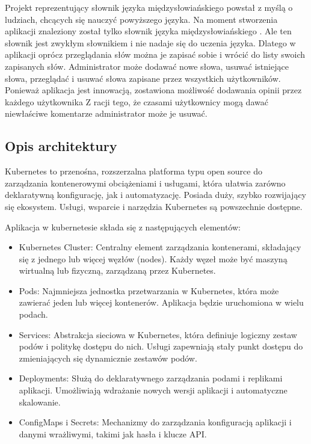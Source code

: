 \documentclass[12pt,a4paper]{article}
\begin{document}
Projekt reprezentujący słownik języka międzysłowiańskiego powstał z myślą o ludziach, chcących się nauczyć powyższego języka. Na moment stworzenia aplikacji znaleziony został tylko słownik języka międzysłowiańskiego \cite{slownik}. Ale ten słownik jest zwykłym słownikiem i nie nadaje się do uczenia języka. Dlatego w aplikacji oprócz przeglądania słów można je zapisać sobie i wrócić do listy swoich zapisanych słów. Administrator może dodawać nowe słowa, usuwać istniejące słowa, przeglądać i usuwać słowa zapisane przez wszystkich użytkowników. Ponieważ aplikacja jest innowacją, zostawiona możliwość dodawania opinii przez każdego użytkownika Z racji tego, że czasami użytkownicy mogą dawać niewłaściwe komentarze administrator może je usuwać.

\subsection{Opis architektury}
\label{sec:introduction}

Kubernetes to przenośna, rozszerzalna platforma typu open source do zarządzania kontenerowymi obciążeniami i usługami, która ułatwia zarówno deklaratywną konfigurację, jak i automatyzację. Posiada duży, szybko rozwijający się ekosystem. Usługi, wsparcie i narzędzia Kubernetes są powszechnie dostępne.

Aplikacja w kubernetesie składa się z następujących elementów:

\begin{itemize}
    \item Kubernetes Cluster: Centralny element zarządzania kontenerami, składający się z jednego lub więcej węzłów (nodes). Każdy węzeł może być maszyną wirtualną lub fizyczną, zarządzaną przez Kubernetes.

    \item Pods: Najmniejsza jednostka przetwarzania w Kubernetes, która może zawierać jeden lub więcej kontenerów. Aplikacja będzie uruchomiona w wielu podach.

    \item Services: Abstrakcja sieciowa w Kubernetes, która definiuje logiczny zestaw podów i politykę dostępu do nich. Usługi zapewniają stały punkt dostępu do zmieniających się dynamicznie zestawów podów.

    \item Deployments: Służą do deklaratywnego zarządzania podami i replikami aplikacji. Umożliwiają wdrażanie nowych wersji aplikacji i automatyczne skalowanie.

    \item ConfigMaps i Secrets: Mechanizmy do zarządzania konfiguracją aplikacji i danymi wrażliwymi, takimi jak hasła i klucze API.
    
\end{itemize}
\end{document}
